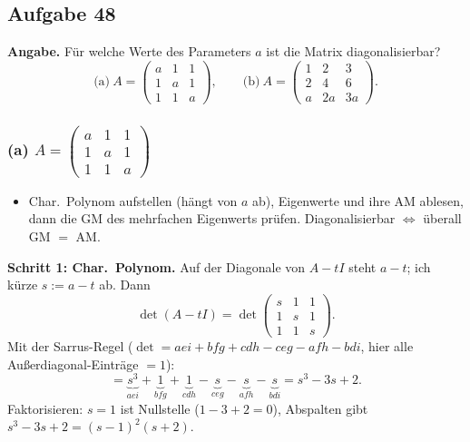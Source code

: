 \documentclass[a4paper,12pt]{article}
\begin{document}
\subsection*{Aufgabe 48}

\textbf{Angabe.} F\"ur welche Werte des Parameters $a$ ist die Matrix diagonalisierbar?
\[
\text{(a)}\ A = \begin{pmatrix} a & 1 & 1 \\ 1 & a & 1 \\ 1 & 1 & a \end{pmatrix}, \qquad
\text{(b)}\ A = \begin{pmatrix} 1 & 2 & 3 \\ 2 & 4 & 6 \\ a & 2a & 3a \end{pmatrix}.
\]

\subsubsection*{(a) $A = \left(\begin{smallmatrix} a & 1 & 1 \\ 1 & a & 1 \\ 1 & 1 & a \end{smallmatrix}\right)$}

\begin{wastun}
\begin{itemize}[leftmargin=*, nosep]
    \item Char.\ Polynom aufstellen (h\"angt von $a$ ab), Eigenwerte und ihre AM ablesen, dann die GM des mehrfachen Eigenwerts pr\"ufen. Diagonalisierbar $\Leftrightarrow$ \"uberall GM $=$ AM.
\end{itemize}
\end{wastun}

\textbf{Schritt 1: Char.\ Polynom.} Auf der Diagonale von $A - tI$ steht $a - t$; ich k\"urze $s := a - t$ ab. Dann
\[
\det(A - tI) = \det\begin{pmatrix} s & 1 & 1 \\ 1 & s & 1 \\ 1 & 1 & s \end{pmatrix}.
\]
Mit der Sarrus-Regel ($\det = aei + bfg + cdh - ceg - afh - bdi$, hier alle Au\ss erdiagonal-Eintr\"age $= 1$):
\[
= \underbrace{s^3}_{aei} + \underbrace{1}_{bfg} + \underbrace{1}_{cdh} - \underbrace{s}_{ceg} - \underbrace{s}_{afh} - \underbrace{s}_{bdi} = s^3 - 3s + 2.
\]
Faktorisieren: $s = 1$ ist Nullstelle ($1 - 3 + 2 = 0$), Abspalten gibt $s^3 - 3s + 2 = (s-1)^2(s+2)$.
\end{document}
